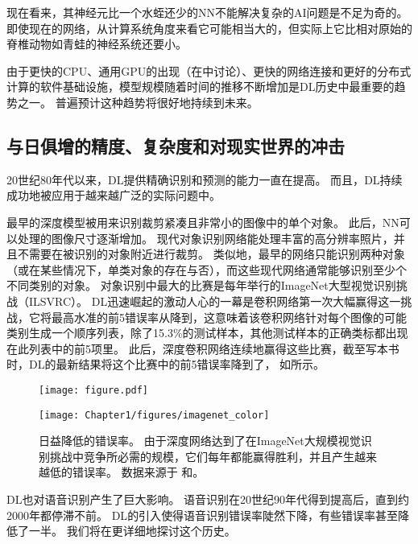 现在看来，其神经元比一个水蛭还少的\gls{NN}不能解决复杂的\gls{AI}问题是不足为奇的。
即使现在的网络，从计算系统角度来看它可能相当大的，但实际上它比相对原始的脊椎动物如青蛙的神经系统还要小。

由于更快的CPU、通用GPU的出现（在中讨论）、更快的网络连接和更好的分布式计算的软件基础设施，模型规模随着时间的推移不断增加是\gls{DL}历史中最重要的趋势之一。
普遍预计这种趋势将很好地持续到未来。


\subsection{与日俱增的精度、复杂度和对现实世界的冲击}
\label{sec:increasing_accuracy_complexity_and_real_world_impact}

20世纪80年代以来，\gls{DL}提供精确识别和预测的能力一直在提高。
而且，\gls{DL}持续成功地被应用于越来越广泛的实际问题中。

最早的深度模型被用来识别裁剪紧凑且非常小的图像中的单个对象\citep{Rumelhart86}。
此后，\gls{NN}可以处理的图像尺寸逐渐增加。
现代对象识别网络能处理丰富的高分辨率照片，并且不需要在被识别的对象附近进行裁剪\citep{Krizhevsky-2012}。
类似地，最早的网络只能识别两种对象（或在某些情况下，单类对象的存在与否），而这些现代网络通常能够识别至少个不同类别的对象。
对象识别中最大的比赛是每年举行的ImageNet大型视觉识别挑战（ILSVRC）。
\gls{DL}迅速崛起的激动人心的一幕是卷积网络第一次大幅赢得这一挑战，它将最高水准的前5错误率从降到\citep{Krizhevsky-2012}，这意味着该卷积网络针对每个图像的可能类别生成一个顺序列表，除了15.3\%的测试样本，其他测试样本的正确类标都出现在此列表中的前5项里。
此后，深度卷积网络连续地赢得这些比赛，截至写本书时，\gls{DL}的最新结果将这个比赛中的前5错误率降到了， 如所示。

\begin{figure}[!htb]
\ifOpenSource
\centerline{\texttt{[image: figure.pdf]}}
\else
\centerline{\texttt{[image: Chapter1/figures/imagenet\_color]}}
\fi
\caption{日益降低的错误率。
由于深度网络达到了在ImageNet大规模视觉识别挑战中竞争所必需的规模，它们每年都能赢得胜利，并且产生越来越低的错误率。
数据来源于 \citet{russakovsky2014imagenet}和\citet{He-et-al-arxiv2015}。}
\label{fig:chap1_imagenet_color}
\end{figure}


\gls{DL}也对语音识别产生了巨大影响。
语音识别在20世纪90年代得到提高后，直到约2000年都停滞不前。
\gls{DL}的引入\citep{dahl2010phonerec,Deng-2010,Seide2011,Hinton-et-al-2012}使得语音识别错误率陡然下降，有些错误率甚至降低了一半。
我们将在更详细地探讨这个历史。

